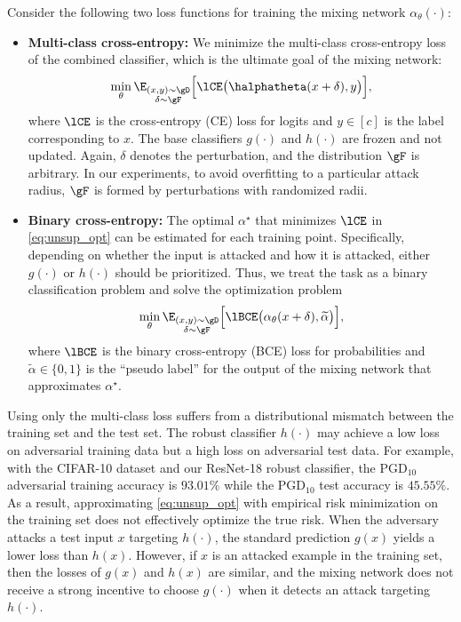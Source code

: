 \documentclass[11pt, letterpaper]{article}
\theoremstyle{plain}
\theoremstyle{definition}
\begin{document}
Consider the following two loss functions for training the mixing network $\alpha_\theta (\cdot)$:
\begin{itemize}[leftmargin=6mm]
\setlength\itemsep{1pt}
    \item \textbf{Multi-class cross-entropy:} We minimize the multi-class cross-entropy loss of the combined classifier, which is the ultimate goal of the mixing network:
    \begin{equation} \label{eq:unsup_opt}
        \min_\theta \E_{\substack{(x, y) \sim \gD \\ \delta \sim \gF}} \Big[ \lCE \big( \halphatheta (x+\delta), y \big) \Big],
    \end{equation}
    where $\lCE$ is the cross-entropy (CE) loss for logits and $y \in [c]$ is the label corresponding to $x$. The base classifiers $g (\cdot)$ and $h (\cdot)$ are frozen and not updated. Again, $\delta$ denotes the perturbation, and the distribution $\gF$ is arbitrary. In our experiments, to avoid overfitting to a particular attack radius, $\gF$ is formed by perturbations with randomized radii.  
    
    \item \textbf{Binary cross-entropy:} The optimal $\alpha^\star$ that minimizes $\lCE$ in \cref{eq:unsup_opt} can be estimated for each training point. Specifically, depending on whether the input is attacked and how it is attacked, either $g (\cdot)$ or $h (\cdot)$ should be prioritized. Thus, we treat the task as a binary classification problem and solve the optimization problem
    \begin{equation*}
        \min_\theta \E_{\substack{(x, y) \sim \gD \\ \delta \sim \gF}} \Big[ \lBCE \big( \alpha_\theta (x+\delta), \widetilde{\alpha} \big) \Big],
    \end{equation*}
    where $\lBCE$ is the binary cross-entropy (BCE) loss for probabilities and $\widetilde{\alpha} \in \{0, 1\}$ is the ``pseudo label'' for the output of the mixing network that approximates $\alpha^\star$.
\end{itemize}

Using only the multi-class loss suffers from a distributional mismatch between the training set and the test set. The robust classifier $h (\cdot)$ may achieve a low loss on adversarial training data but a high loss on adversarial test data. For example, with the CIFAR-10 dataset and our ResNet-18 robust classifier, the PGD$_{10}$ adversarial training accuracy is $93.01 \%$ while the PGD$_{10}$ test accuracy is $45.55 \%$. As a result, approximating \cref{eq:unsup_opt} with empirical risk minimization on the training set does not effectively optimize the true risk. When the adversary attacks a test input $x$ targeting $h (\cdot)$, the standard prediction $g (x)$ yields a lower loss than $h (x)$. However, if $x$ is an attacked example in the training set, then the losses of $g (x)$ and $h (x)$ are similar, and the mixing network does not receive a strong incentive to choose $g (\cdot)$ when it detects an attack targeting $h (\cdot)$.
\end{document}
